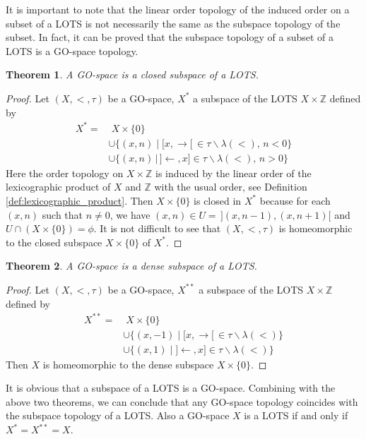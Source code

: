 \documentclass[12pt,oneside,english]{amsbook}
\numberwithin{equation}{section} %
\numberwithin{figure}{section} %
\theoremstyle{plain}
\numberwithin{section}{chapter}
\newtheorem{thm}{Theorem}[section]
\theoremstyle{plain}
\begin{document}
It is important to note that the linear order topology of the induced order on a subset of a LOTS is not necessarily the same as the subspace topology of the subset. In fact, it can be proved that the subspace topology of a subset of a LOTS is a GO-space topology.
\begin{thm}\label{X*}
  A GO-space is a closed subspace of a LOTS.
\end{thm}
\begin{proof}
  Let $(X,<,\tau)$ be a GO-space, $X^{*}$ a subspace of the LOTS $X \times \mathbb{Z}$ defined by
  \begin{align*}
    X^{*} =& \; X \times \{0\} \\
    &\cup \{(x,n) \; | \; [x, \rightarrow[ \, \in \tau \backslash \lambda (<), \, n < 0 \} \\
    &\cup \{(x,n) \, | \, ] \leftarrow, x] \in \tau \backslash \lambda (<), \, n > 0 \}
  \end{align*}
  Here the order topology on $X \times \mathbb{Z}$ is induced by the linear order of the lexicographic product of $X$ and $\mathbb{Z}$ with the usual order, see Definition \ref{def:lexicographic_product}. Then $X \times \{0\}$ is closed in $X^{*}$ because for each $(x,n)$ such that $n \neq 0$, we have $(x,n) \in U = \, ](x, n-1), (x, n+1)[$ and $U \cap (X \times \{0\}) = \phi$. It is not difficult to see that $(X, <, \tau)$ is homeomorphic to the closed subspace $X \times \{0\}$ of $X^{*}$.
\end{proof}

\begin{thm}
  A GO-space is a dense subspace of a LOTS.
\end{thm}
\begin{proof}
  Let $(X,<,\tau)$ be a GO-space, $X^{**}$ a subspace of the LOTS $X \times \mathbb{Z}$ defined by
  \begin{align*}
    X^{**} =& \; X \times \{0\} \\
    &\cup \{(x,-1) \; | \; [x, \rightarrow[ \, \in \tau \backslash \lambda (<)\} \\
    &\cup \{(x,1) \; | \; ] \leftarrow, x] \in \tau \backslash \lambda (<) \}
  \end{align*}
  Then $X$ is homeomorphic to the dense subspace $X \times \{0\}$.
\end{proof}

It is obvious that a subspace of a LOTS is a GO-space. Combining with the above two theorems, we can conclude that any GO-space topology coincides with the subspace topology of  a LOTS. Also a GO-space $X$ is a LOTS if and only if $X^{*} = X^{**} = X$.
\end{document}
